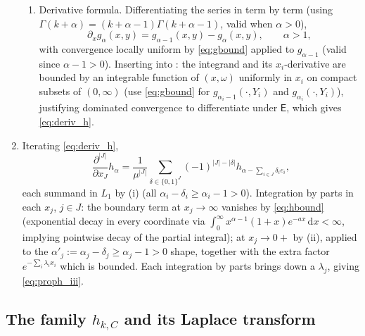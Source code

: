 \documentclass[14pt]{extarticle}
\makeatletter
\theoremstyle{definition}
\renewenvironment{proof}[1][\proofname]{\par
  \pushQED{\qed}%
  \normalfont \topsep6\p@\@plus6\p@\relax
  \trivlist
  \item[\hskip\labelsep\bfseries #1\@addpunct{.}]\ignorespaces
}{%
  \popQED\endtrivlist\@endpefalse
}
\newcommand{\EE}{\mathsf{E}}
\newcommand{\dd}{\mathrm{d}}
\makeatother
\begin{document}
\begin{proof}
\begin{enumerate}[label=(\roman*)]
\begin{enumerate}
        \item Derivative formula.  Differentiating the series in
           term by term (using
          $\Gamma(k+\alpha)=(k+\alpha-1)\Gamma(k+\alpha-1)$, valid when
          $\alpha>0$),
          \begin{equation}\label{eq:g_deriv}
            \partial_x g_\alpha(x,y)=g_{\alpha-1}(x,y)-g_\alpha(x,y),
            \qquad\alpha>1,
          \end{equation}
          with convergence locally uniform by \eqref{eq:gbound} applied
          to $g_{\alpha-1}$ (valid since $\alpha-1>0$).  Inserting into
          : the integrand and its $x_i$-derivative are
          bounded by an integrable function of $(x,\omega)$ uniformly in
          $x_i$ on compact subsets of $(0,\infty)$ (use \eqref{eq:gbound}
          for $g_{\alpha_i-1}(\cdot,Y_i)$ and $g_{\alpha_i}(\cdot,Y_i)$),
          justifying dominated convergence to differentiate under $\EE$,
          which gives \eqref{eq:deriv_h}.
      \end{enumerate}

    \item Iterating \eqref{eq:deriv_h},
      \begin{equation}\label{eq:derivJ_h}
        \frac{\partial^{|J|}}{\partial x_J}h_\alpha
        =\frac{1}{\mu^{|J|}}\sum_{\delta\in\{0,1\}^J}(-1)^{|J|-|\delta|}
          h_{\alpha-\sum_{i\in J}\delta_ie_i},
      \end{equation}
      each summand in $L_1$ by (i) (all $\alpha_i-\delta_i\geqslant\alpha_i-1>0$).
      Integration by parts in each $x_j$, $j\in J$: the boundary term at
      $x_j\to\infty$ vanishes by \eqref{eq:hbound} (exponential decay in
      every coordinate via $\int_0^\infty x^{\alpha-1}(1+x)e^{-ax}\,\dd x<\infty$,
      implying pointwise decay of the partial integral); at $x_j\to 0+$
      by (ii), applied to the $\alpha'_j:=\alpha_j-\delta_j\geqslant\alpha_j-1>0$
      shape, together with the extra factor $e^{-\sum_i\lambda_ix_i}$
      which is bounded.  Each integration by parts brings down a
      $\lambda_j$, giving \eqref{eq:proph_iii}.
  \end{enumerate}
\end{proof}


\subsection{The family $h_{k,C}$ and its Laplace transform}
  \label{sec:hkC}
\end{document}
